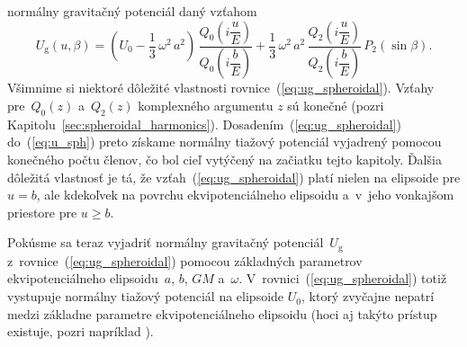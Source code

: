\documentclass[a4paper, 12pt]{book}
\newcommand{\gidx}{\mathrm g}
\begin{document}
normálny gravitačný potenciál daný vzťahom
%
\begin{equation}
\label{eq:ug_spheroidal}
U_\gidx(u, \beta) = \left( U_0 - \frac{1}{3} \, \omega^2 \, a^2 \right) \, 
\frac{Q_0\left( i \dfrac{u}{E} \right)}{Q_0\left( i \dfrac{b}{E} \right)} 
+ \frac{1}{3} \, \omega^2 \, a^2  \, \frac{Q_2\left( i \dfrac{u}{E} 
\right)}{Q_2\left( i \dfrac{b}{E} \right)} \, P_2(\sin\beta){.}
\end{equation}
%
Všimnime si niektoré dôležité vlastnosti rovnice~(\ref{eq:ug_spheroidal}).  
Vzťahy pre~$Q_0(z)$ a~$Q_2(z)$ komplexného argumentu $z$ sú konečné (pozri 
Kapitolu~\ref{sec:spheroidal_harmonics}).  Dosadením~(\ref{eq:ug_spheroidal}) 
do~(\ref{eq:u_sph}) preto získame normálny tiažový potenciál vyjadrený pomocou 
konečného počtu členov, čo bol cieľ vytýčený na začiatku tejto kapitoly.  
Ďalšia dôležitá vlastnosť je tá, že vzťah~(\ref{eq:ug_spheroidal}) platí nielen 
na elipsoide pre $u = b$, ale kdekoľvek na povrchu ekvipotenciálneho elipsoidu 
a~v~jeho vonkajšom priestore pre $u \geq b$.

Pokúsme sa teraz vyjadriť normálny gravitačný potenciál~$U_\gidx$ 
z~rovnice~(\ref{eq:ug_spheroidal}) pomocou základných parametrov 
ekvipotenciálneho elipsoidu~$a$, $b$, $GM$ a~$\omega$.  
V~rovnici~(\ref{eq:ug_spheroidal}) totiž vystupuje normálny tiažový potenciál 
na elipsoide $U_0$, ktorý zvyčajne nepatrí medzi základne parametre 
ekvipotenciálneho elipsoidu (hoci aj takýto prístup existuje, pozri napríklad 
\cite{TorgeGeodesy}).
\end{document}
